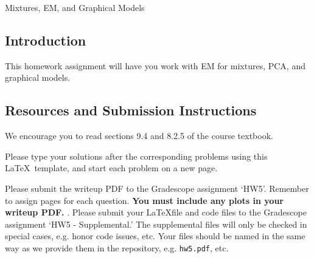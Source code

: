 \documentclass[submit]{../harvardml}
\begin{document}
\begin{center}
{\Large Mixtures, EM, and Graphical Models}\\
\end{center}

\subsection*{Introduction}

This homework assignment will have you work with EM for mixtures, PCA, and graphical models.

\subsection*{Resources and Submission Instructions}

We encourage you to read sections 9.4 and 8.2.5 of the course textbook.

Please type your solutions after the corresponding problems using this \LaTeX\ template, and start each problem on a new page.

Please submit the writeup PDF to the Gradescope assignment `HW5'. Remember to assign pages for each question.  \textbf{You must include any plots in your writeup PDF. }. Please submit your \LaTeX file and code files to the Gradescope assignment `HW5 - Supplemental.' The supplemental files will only be checked in special cases, e.g. honor code issues, etc. Your files should be named in the same way as we provide them in the repository, e.g. \texttt{hw5.pdf}, etc.
\end{document}
